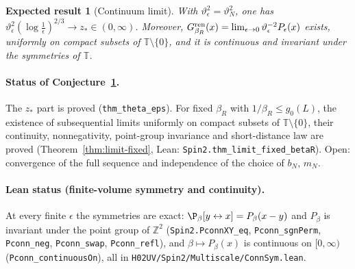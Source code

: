 \documentclass[11pt]{amsart}
\newtheorem{conjecture}[theorem]{Expected result}
\theoremstyle{definition}
\theoremstyle{remark}
\numberwithin{equation}{section}
\newcommand{\Z}{\mathbb{Z}}
\newcommand{\T}{\mathbb{T}}
\begin{document}
\begin{conjecture}[Continuum limit]\label{thm:limit}
With $\vartheta_\epsilon^2=\vartheta_N^2$, one has
$\vartheta_\epsilon^2(\log\frac1\epsilon)^{2/3}\to z_*\in(0,\infty)$. Moreover,
$G^{\rm ren}_{\beta_R}(x)=\lim_{\epsilon\to0}\vartheta_\epsilon^{-2}P_\epsilon(x)$ exists, uniformly
on compact subsets of $\T\setminus\{0\}$, and it is continuous and invariant under the
symmetries of $\T$.
\end{conjecture}

\paragraph{Status of Conjecture~\ref{thm:limit}.} The $z_*$ part is proved (\texttt{thm\_theta\_eps}). For fixed
$\beta_R$ with $1/\beta_R\le g_0(L)$, the existence of subsequential limits uniformly on compact subsets of
$\T\setminus\{0\}$, their continuity, nonnegativity, point-group invariance and short-distance law are proved
(Theorem~\ref{thm:limit-fixed}, Lean: \texttt{Spin2.thm\_limit\_fixed\_betaR}). Open: convergence of the full sequence
and independence of the choice of $b_N$, $m_N$.

\paragraph{Lean status (finite-volume symmetry and continuity).} At every finite $\epsilon$ the
symmetries are exact: $\P_\beta[y\leftrightarrow x]=P_\beta(x-y)$ and $P_\beta$ is invariant under
the point group of $\Z^2$ (\texttt{Spin2.PconnXY\_eq}, \texttt{Pconn\_sgnPerm}, \texttt{Pconn\_neg},
\texttt{Pconn\_swap}, \texttt{Pconn\_refl}), and $\beta\mapsto P_\beta(x)$ is continuous on
$[0,\infty)$ (\texttt{Pconn\_continuousOn}), all in \texttt{H02UV/Spin2/Multiscale/ConnSym.lean}.
\end{document}
